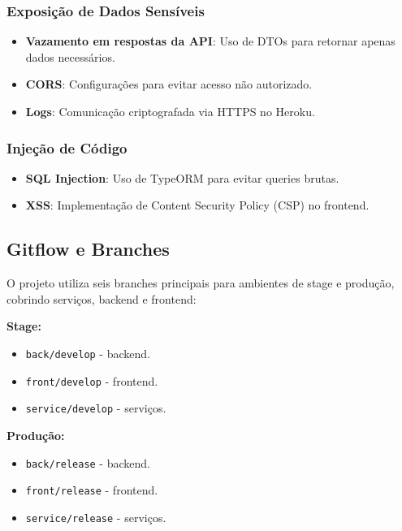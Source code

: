 \documentclass[12pt, a4paper]{article}
\begin{document}
\begin{spacing}{1.5}
\subsubsection{Exposição de Dados Sensíveis}
\begin{spacing}{1.5}
\begin{itemize}
    \item \textbf{Vazamento em respostas da API}: Uso de DTOs para retornar apenas dados necessários.
    \item \textbf{CORS}: Configurações para evitar acesso não autorizado.
    \item \textbf{Logs}: Comunicação criptografada via HTTPS no Heroku.
\end{itemize}
\end{spacing}

\subsubsection{Injeção de Código}
\begin{spacing}{1.5}
\begin{itemize}
    \item \textbf{SQL Injection}: Uso de TypeORM para evitar queries brutas.
    \item \textbf{XSS}: Implementação de Content Security Policy (CSP) no frontend.
\end{itemize}
\end{spacing}

\subsection{Gitflow e Branches}
\begin{spacing}{1.5}
O projeto utiliza seis branches principais para ambientes de stage e produção, cobrindo serviços, backend e frontend:

\textbf{Stage:}
\begin{itemize}
    \item \texttt{back/develop} - backend.
    \item \texttt{front/develop} - frontend.
    \item \texttt{service/develop} - serviços.
\end{itemize}

\textbf{Produção:}
\begin{itemize}
    \item \texttt{back/release} - backend.
    \item \texttt{front/release} - frontend.
    \item \texttt{service/release} - serviços.
\end{itemize}


\end{spacing}
\end{spacing}
\end{document}
